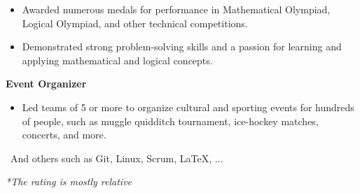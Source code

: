 \documentclass[10pt,a4paper,ragged2e]{altacv}
\begin{document}
\begin{itemize}
\item Awarded numerous medals for performance in Mathematical Olympiad, Logical Olympiad, and other technical competitions.
\item Demonstrated strong problem-solving skills and a passion for learning and applying mathematical and logical concepts.
\end{itemize}

\vspace{4px}

\textbf{Event Organizer}

\vspace{2px}

\begin{itemize}
\item Led teams of 5 or more to organize cultural and sporting events for hundreds of people, such as muggle quidditch tournament, ice-hockey matches, concerts, and more.
\end{itemize}

\vspace{8px}




\vspace{10px} \ And others such as Git, Linux, Scrum, LaTeX, ...

\vspace{10px} \textit{*The rating is mostly relative}

\clearpage

\nocite{*}






\end{document}
